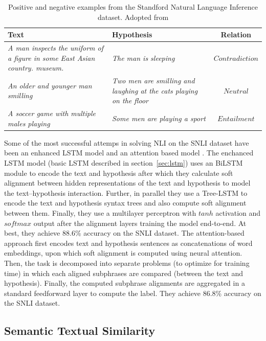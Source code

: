 \begin{table}
	\centering
	\begin{tabular}{p{8cm} | p{5cm} | c}
		Text & Hypothesis & Relation \\
		\toprule
		\textit{
		A man inspects the uniform of a figure in some East Asian country.
		museum.} & 
		\textit{The man is sleeping}
		& $\mathit{Contradiction}$ \\
		\textit{An older and younger man smilling} & 
		\textit{Two men are smilling and laughing at the cats playing on the floor}
		& $\mathit{Neutral}$ \\
		\textit{A soccer game with multiple males playing} &
		\textit{Some men are playing a sport} & $\mathit{Entailment}$ \\
		\bottomrule
	\end{tabular}
	\caption{Positive and negative examples from the Standford Natural Language Inference dataset. 
	Adopted from \citep{bowman2015large}}
	\label{tab:snli_examples}
\end{table}

Some of the most successful attemps in solving NLI on the SNLI dataset have been
an enhanced LSTM model \citep{chen2016enhanced} and 
an attention based model \citep{parikh2016decomposable}. 
The enchanced LSTM model (basic LSTM described in section~\ref{sec:lstm}) 
uses an BiLSTM module to encode the text and hypothesis after which they calculate 
soft alignment between hidden representations of the text and hypothesis to model the
text--hypothesis interaction. Further, in parallel they use a Tree-LSTM to encode 
the text and hypothesis syntax trees and also compute soft alignment between them. 
Finally, they use a multilayer perceptron with $\mathit{tanh}$ activation and 
$\mathit{softmax}$ output after the alignment layers training the model end-to-end. 
At best, they achieve 88.6\% accuracy on the SNLI dataset. 
The attention-based approach \citep{parikh2016decomposable} first encodes 
text and hypothesis sentences as concatenations of word embeddings, upon which
soft alignment is computed using
neural attention. Then, the task is decomposed into separate problems (to optimize 
for training time) in which each aligned subphrases are compared (between the text and 
hypothesis). Finally, the computed subphrase alignments are aggregated in 
a standard feedforward layer to compute the label. They achieve 
86.8\% accuracy on the SNLI dataset. 

\subsection{Semantic Textual Similarity}
\label{sec:sts}

